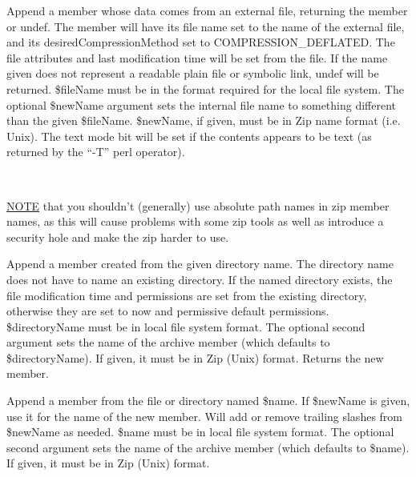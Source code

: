 \documentclass[]{article}
\renewcommand{\emph}[1]{\underline{#1}}
\begin{document}
\begin{description}
\itemsep1pt\parskip0pt
\item[addFile( \$fileName {[}, \$newName {]} )]
Append a member whose data comes from an external file, returning the
member or undef. The member will have its file name set to the name of
the external file, and its desiredCompressionMethod set to
COMPRESSION\_DEFLATED. The file attributes and last modification time
will be set from the file. If the name given does not represent a
readable plain file or symbolic link, undef will be returned. \$fileName
must be in the format required for the local file system. The optional
\$newName argument sets the internal file name to something different
than the given \$fileName. \$newName, if given, must be in Zip name
format (i.e. Unix). The text mode bit will be set if the contents
appears to be text (as returned by the ``-T'' perl operator).

~

\emph{NOTE} that you shouldn't (generally) use absolute path names in
zip member names, as this will cause problems with some zip tools as
well as introduce a security hole and make the zip harder to use.
\end{description}

\begin{description}
\itemsep1pt\parskip0pt
\item[addDirectory( \$directoryName {[}, \$fileName {]} )]
Append a member created from the given directory name. The directory
name does not have to name an existing directory. If the named directory
exists, the file modification time and permissions are set from the
existing directory, otherwise they are set to now and permissive default
permissions. \$directoryName must be in local file system format. The
optional second argument sets the name of the archive member (which
defaults to \$directoryName). If given, it must be in Zip (Unix) format.
Returns the new member.
\end{description}

\begin{description}
\itemsep1pt\parskip0pt
\item[addFileOrDirectory( \$name {[}, \$newName {]} )]
Append a member from the file or directory named \$name. If \$newName is
given, use it for the name of the new member. Will add or remove
trailing slashes from \$newName as needed. \$name must be in local file
system format. The optional second argument sets the name of the archive
member (which defaults to \$name). If given, it must be in Zip (Unix)
format.
\end{description}
\end{document}
